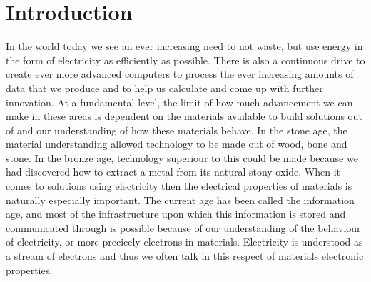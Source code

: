 \chapter{Introduction}\noindent


In the world today we see an ever increasing need to not waste, but use energy in the form of electricity as
efficiently as possible. There is also a continuous drive to create ever more advanced computers to process
the ever increasing amounts of data that we produce and to help us calculate and come up with further innovation.
At a fundamental level, the limit of how much advancement we can make in these areas is dependent on the
materials available to build solutions out of and our understanding of how these materials behave. In the stone
age, the material understanding allowed technology to be made out of wood, bone and stone. In the bronze age,
technology superiour to this could be made because we had discovered how to extract a metal from its natural
stony oxide. When it comes
to solutions using electricity then the electrical properties of materials is naturally especially important. The
current age has been called the information age, and most of the infrastructure upon which this information is
stored and communicated through is possible because of our understanding of the behaviour of electricity,
or more precicely electrons in materials.
Electricity is understood as a stream of electrons and thus we often talk in this respect of materials
electronic properties.

